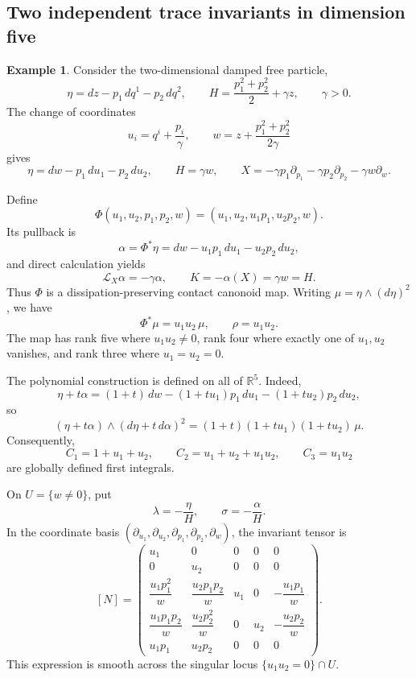 \documentclass[11pt,a4paper]{article}
\numberwithin{equation}{section}
\theoremstyle{definition}
\newtheorem{example}{Example}
\theoremstyle{remark}
\begin{document}
\subsection{Two independent trace invariants in dimension five}
\begin{example}
Consider the two-dimensional damped free particle,
\[
\eta=dz-p_1\,dq^1-p_2\,dq^2,
\qquad
H=\frac{p_1^2+p_2^2}{2}+\gamma z,
\qquad \gamma>0.
\]
The change of coordinates
\[
u_i=q^i+\frac{p_i}{\gamma},
\qquad
w=z+\frac{p_1^2+p_2^2}{2\gamma}
\]
gives
\[
\eta=dw-p_1\,du_1-p_2\,du_2,
\qquad
H=\gamma w,
\qquad
X=-\gamma p_1\partial_{p_1}
  -\gamma p_2\partial_{p_2}
  -\gamma w\partial_w.
\]

Define
\[
\Phi(u_1,u_2,p_1,p_2,w)
=(u_1,u_2,u_1p_1,u_2p_2,w).
\]
Its pullback is
\[
\alpha=\Phi^*\eta
=dw-u_1p_1\,du_1-u_2p_2\,du_2,
\]
and direct calculation yields
\[
\mathcal L_X\alpha=-\gamma\alpha,
\qquad
K=-\alpha(X)=\gamma w=H.
\]
Thus $\Phi$ is a dissipation-preserving contact canonoid map.
Writing $\mu=\eta\wedge(d\eta)^2$, we have
\[
\Phi^*\mu=u_1u_2\,\mu,
\qquad
\rho=u_1u_2.
\]
The map has rank five where $u_1u_2\neq0$, rank four where
exactly one of $u_1,u_2$ vanishes, and rank three where
$u_1=u_2=0$.

The polynomial construction is defined on all of
$\mathbb R^5$. Indeed,
\[
\eta+t\alpha
=(1+t)\,dw
 -(1+tu_1)p_1\,du_1
 -(1+tu_2)p_2\,du_2,
\]
so
\[
(\eta+t\alpha)\wedge(d\eta+t\,d\alpha)^2
=(1+t)(1+tu_1)(1+tu_2)\,\mu.
\]
Consequently,
\[
C_1=1+u_1+u_2,\qquad
C_2=u_1+u_2+u_1u_2,\qquad
C_3=u_1u_2
\]
are globally defined first integrals.

On $U=\{w\neq0\}$, put
\[
\lambda=-\frac{\eta}{H},
\qquad
\sigma=-\frac{\alpha}{H}.
\]
In the coordinate basis
$(\partial_{u_1},\partial_{u_2},
  \partial_{p_1},\partial_{p_2},\partial_w)$,
the invariant tensor is
\[
[N]=
\begin{pmatrix}
u_1 & 0 & 0 & 0 & 0\\
0 & u_2 & 0 & 0 & 0\\
\dfrac{u_1p_1^2}{w}
&
\dfrac{u_2p_1p_2}{w}
&
u_1 & 0 & -\dfrac{u_1p_1}{w}\\
\dfrac{u_1p_1p_2}{w}
&
\dfrac{u_2p_2^2}{w}
&
0 & u_2 & -\dfrac{u_2p_2}{w}\\
u_1p_1 & u_2p_2 & 0 & 0 & 0
\end{pmatrix}.
\]
This expression is smooth across the singular locus
$\{u_1u_2=0\}\cap U$.


\end{example}
\end{document}
